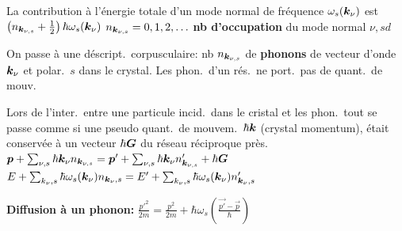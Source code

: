 \begin{squishlist}
    \item La contribution à l'énergie totale d'un mode normal de fréquence $\omega_s(\bm{k}_{\nu})$ est $\left( n_{\bm{k}_{\nu,s}} + \frac{1}{2}\right) \hbar \omega_s(\bm{k}_{\nu})$ \qquad $n_{\bm{k}_{\nu,s}} = 0,1,2,\ldots$ \textbf{nb d'occupation} du mode normal $\nu,sd$
    \item On passe à une déscript.\ corpusculaire: nb $n_{\bm{k}_{\nu,s}}$ de \textbf{phonons} de vecteur d'onde $\bm{k}_{\nu}$ et polar.\ $s$ dans le crystal.
    Les phon.\ d'un rés.\ ne port.\ pas de quant.\ de mouv.\

    \item Lors de l’inter.\ entre une particule incid.\ dans le cristal et les phon.\, tout se passe comme si une pseudo quant.\ de mouvem.\, $\hbar \bm{k}$ (crystal momentum), était conservée à un vecteur $\hbar \bm{G}$ du réseau réciproque près. \\
    $\bm{p} + \sum_{\nu,s}\hbar \bm{k}_{\nu}n_{\bm{k}_{\nu,s}} = \bm{p}' + \sum_{\nu,s}\hbar \bm{k}_{\nu}n'_{\bm{k}_{\nu,s}} + \hbar \bm{G}$ \qquad \\
    $E + \sum_{k_{\nu},s} \hbar \omega_s (\bm{k}_{\nu}) n_{\bm{k}_{\nu},s} = E' + \sum_{k_{\nu},s} \hbar \omega_s (\bm{k}_{\nu}) n'_{\bm{k}_{\nu},s}$

    \item \textbf{Diffusion à un phonon:} $\frac{p'^2}{2m} = \frac{p^2}{2m} + \hbar \omega_s \left( \frac{\vec{p'}-\vec{p}}{\hbar}\right)$
    
\end{squishlist}

